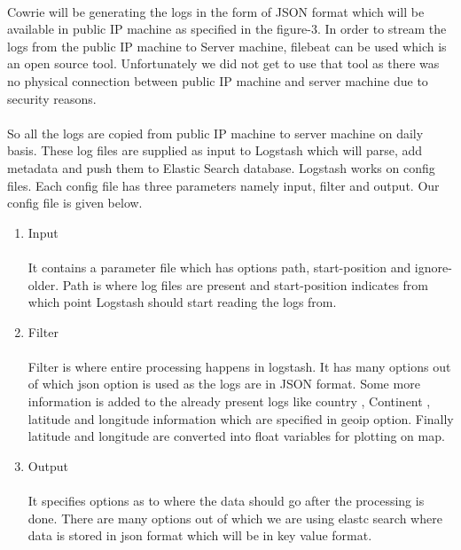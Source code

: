 \documentclass{report}
\begin{document}
\paragraph{}
Cowrie will be generating the logs in the form of JSON format which will be available in public IP machine as specified in the figure-3. In order to stream the logs from the public IP machine to Server machine, filebeat can be used which is an open source tool. Unfortunately we did not get to use that tool as there was no physical connection between public IP machine and server machine due to security reasons. 

\paragraph{}
So all the logs are copied from public IP machine to server machine on daily basis. These log files are supplied as input to Logstash which will parse, add metadata and push them to Elastic Search database. Logstash works on config files. Each config file has three parameters namely input, filter and output. Our config file is given below.



\begin{enumerate}
\item Input
\paragraph{}
It contains a parameter file which has options path, start-position and ignore-older. Path is where log files are present and start-position indicates from which point Logstash should start reading the logs from.
\item Filter
\paragraph{}
Filter is where entire processing happens in logstash. It has many options out of which json option is used as the logs are in JSON format. Some more information is added to the already present logs like country , Continent , latitude and longitude information which are specified in geoip option. Finally latitude and longitude are converted into float variables for plotting on map.
\item Output
\paragraph{}
It specifies options as to where the data should go after the processing is done. There are many options out of which we are using elastc search where data is stored in json format which will be in key value format.
\end{enumerate}
\end{document}
